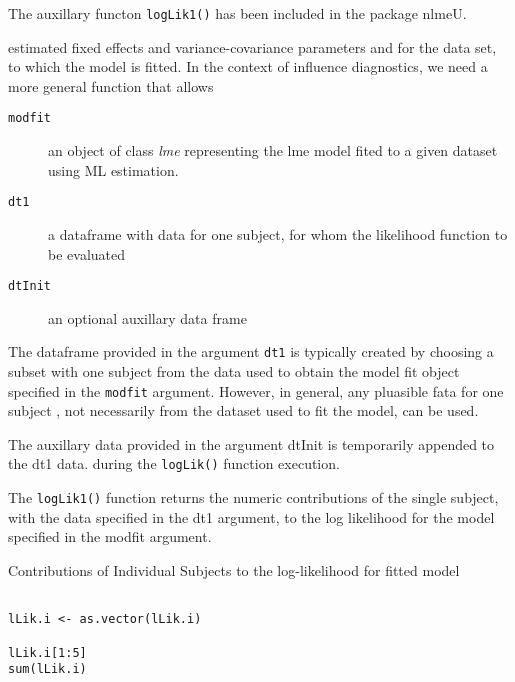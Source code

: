\documentclass[a4paper,12pt]{article}
\begin{document}
The auxillary functon \texttt{logLik1()} has been included in the package nlmeU.

estimated fixed effects and variance-covariance parameters and for the data set, to which the model
is fitted. In the context of influence diagnostics, we need a more general function that allows




\begin{description}
\item[ \texttt{modfit} ] an object of class \textit{lme} representing the lme model fited to a given dataset using ML estimation.
\item[ \texttt{dt1}] a dataframe with data for one subject, for whom the likelihood function to be evaluated
\item[ \texttt{dtInit }] an optional auxillary data frame
\end{description}


The dataframe provided in the argument \texttt{dt1} is typically created by choosing a subset with one subject from the data used to obtain the model fit object specified in the \texttt{modfit} argument.
However, in general, any pluasible fata for one subject , not necessarily from the dataset used to fit the model, can be used.


The auxillary data provided in the argument dtInit is temporarily appended to the dt1 data. during the \texttt{logLik()} function execution.



The \texttt{logLik1()} function returns the numeric contributions of the single subject, with the data specified in the dt1 argument, to the log likelihood
for the model specified in the modfit argument.



Contributions of Individual Subjects to the log-likelihood for fitted model


\begin{framed}
\begin{verbatim}

lLik.i <- as.vector(lLik.i)

lLik.i[1:5]
sum(lLik.i)

\end{verbatim}
\end{framed}
\end{document}
